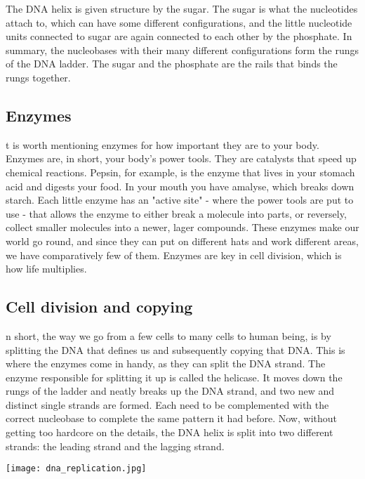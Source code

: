 The DNA helix is given structure by the sugar.
The sugar is what the nucleotides attach to, which can have some different configurations, and the little nucleotide units connected to sugar are again connected to each other by the phosphate.
In summary, the nucleobases with their many different configurations form the rungs of the DNA ladder.
The sugar and the phosphate are the rails that binds the rungs together.

\subsection{Enzymes}
t is worth mentioning enzymes for how important they are to your body.
Enzymes are, in short, your body's power tools.
They are catalysts that speed up chemical reactions.
Pepsin, for example, is the enzyme that lives in your stomach acid and digests your food.
In your mouth you have amalyse, which breaks down starch.
Each little enzyme has an "active site" - where the power tools are put to use - that allows the enzyme to either break a molecule into parts, or reversely, collect smaller molecules into a newer, lager compounds.
These enzymes make our world go round, and since they can put on different hats and work different areas, we have comparatively few of them.
Enzymes are key in cell division, which is how life multiplies. 

\subsection{Cell division and copying}
n short, the way we go from a few cells to many cells to human being, is by splitting the DNA that defines us and subsequently copying that DNA.
This is where the enzymes come in handy, as they can split the DNA strand.
The enzyme responsible for splitting it up is called the helicase.
It moves down the rungs of the ladder and neatly breaks up the DNA strand, and two new and distinct single strands are formed.
Each need to be complemented with the correct nucleobase to complete the same pattern it had before.
Now, without getting too hardcore on the details, the DNA helix is split into two different strands: the leading strand and the lagging strand.

\begin{center}
	\texttt{[image: dna\_replication.jpg]}
\end{center}


